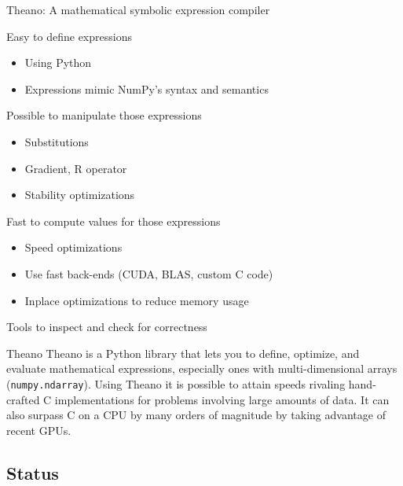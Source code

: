 \documentclass[a4paper,9pt]{beamer}
\begin{document}
\begin{frame}{Theano: A mathematical symbolic expression compiler}

  \begin{block}{Easy to define expressions}
    \begin{itemize}
      \item Using Python
      \item Expressions mimic NumPy's syntax and semantics
    \end{itemize}
  \end{block}

  \begin{block}{Possible to manipulate those expressions}
    \begin{itemize}
      \item Substitutions
      \item Gradient, R operator
      \item Stability optimizations
    \end{itemize}
  \end{block}

  \begin{block}{Fast to compute values for those expressions}
    \begin{itemize}
      \item Speed optimizations
      \item Use fast back-ends (CUDA, BLAS, custom C code)
      \item Inplace optimizations to reduce memory usage
    \end{itemize}
  \end{block}

  Tools to inspect and check for correctness
\end{frame}

\begin{frame}{Theano}
Theano is a Python library that lets you to define, optimize, and evaluate mathematical expressions, especially ones with multi-dimensional arrays (\texttt{numpy.ndarray}). Using Theano it is possible to attain speeds rivaling hand-crafted C implementations for problems involving large amounts of data. It can also surpass C on a CPU by many orders of magnitude by taking advantage of recent GPUs.
\end{frame}


\subsection{Status}
\end{document}
